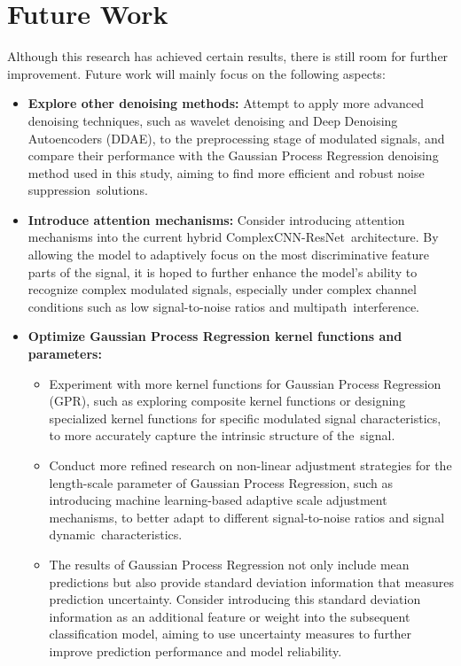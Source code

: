 \documentclass[conference]{IEEEtran}
\begin{document}
\section{Future Work}
Although this research has achieved certain results, there is still room for further improvement. Future work will mainly focus on the following aspects:

\begin{itemize}
    \item \textbf{Explore other denoising methods:} Attempt to apply more advanced denoising techniques, such as wavelet denoising and Deep Denoising Autoencoders (DDAE), to the preprocessing stage of modulated signals, and compare their performance with the Gaussian Process Regression denoising method used in this study, aiming to find more efficient and robust noise suppression~solutions.
    \item \textbf{Introduce attention mechanisms:} Consider introducing attention mechanisms into the current hybrid ComplexCNN-ResNet~architecture. By allowing the model to adaptively focus on the most discriminative feature parts of the signal, it is hoped to further enhance the model's ability to recognize complex modulated signals, especially under complex channel conditions such as low signal-to-noise ratios and multipath~interference.
    \item \textbf{Optimize Gaussian Process Regression kernel functions and parameters:}
    \begin{itemize}
        \item Experiment with more kernel functions for Gaussian Process Regression (GPR), such as exploring composite kernel functions or designing specialized kernel functions for specific modulated signal characteristics, to more accurately capture the intrinsic structure of the~signal.
        \item Conduct more refined research on non-linear adjustment strategies for the length-scale parameter of Gaussian Process Regression, such as introducing machine learning-based adaptive scale adjustment mechanisms, to better adapt to different signal-to-noise ratios and signal dynamic~characteristics.
        \item The results of Gaussian Process Regression not only include mean predictions but also provide standard deviation information that measures prediction uncertainty. Consider introducing this standard deviation information as an additional feature or weight into the subsequent classification model, aiming to use uncertainty measures to further improve prediction performance and model reliability.

\end{itemize}
\end{itemize}
\end{document}
